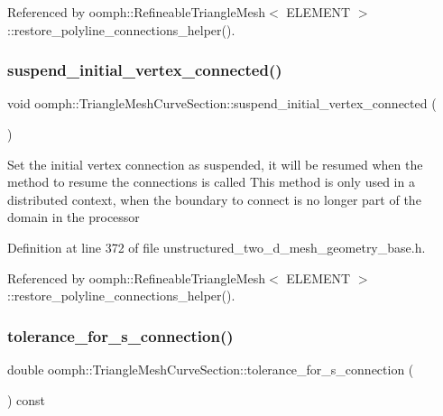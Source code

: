 Referenced by oomph\+::\+Refineable\+Triangle\+Mesh$<$ E\+L\+E\+M\+E\+N\+T $>$\+::restore\+\_\+polyline\+\_\+connections\+\_\+helper().

\mbox{\label{classoomph_1_1TriangleMeshCurveSection_ade6528a99d26583c05a5fd44e21d1ec4}} 
\subsubsection{\texorpdfstring{suspend\+\_\+initial\+\_\+vertex\+\_\+connected()}{suspend\_initial\_vertex\_connected()}}
{\footnotesize\ttfamily void oomph\+::\+Triangle\+Mesh\+Curve\+Section\+::suspend\+\_\+initial\+\_\+vertex\+\_\+connected (\begin{DoxyParamCaption}{ }\end{DoxyParamCaption})\hspace{0.3cm}{\ttfamily [inline]}}

Set the initial vertex connection as suspended, it will be resumed when the method to resume the connections is called This method is only used in a distributed context, when the boundary to connect is no longer part of the domain in the processor 

Definition at line 372 of file unstructured\+\_\+two\+\_\+d\+\_\+mesh\+\_\+geometry\+\_\+base.\+h.



Referenced by oomph\+::\+Refineable\+Triangle\+Mesh$<$ E\+L\+E\+M\+E\+N\+T $>$\+::restore\+\_\+polyline\+\_\+connections\+\_\+helper().

\mbox{\label{classoomph_1_1TriangleMeshCurveSection_a353eb1cc152ccc922c92c584b0bbe1bc}} 
\subsubsection{\texorpdfstring{tolerance\+\_\+for\+\_\+s\+\_\+connection()}{tolerance\_for\_s\_connection()}\hspace{0.1cm}{\footnotesize\ttfamily [1/2]}}
{\footnotesize\ttfamily double oomph\+::\+Triangle\+Mesh\+Curve\+Section\+::tolerance\+\_\+for\+\_\+s\+\_\+connection (\begin{DoxyParamCaption}{ }\end{DoxyParamCaption}) const\hspace{0.3cm}{\ttfamily [inline]}}



